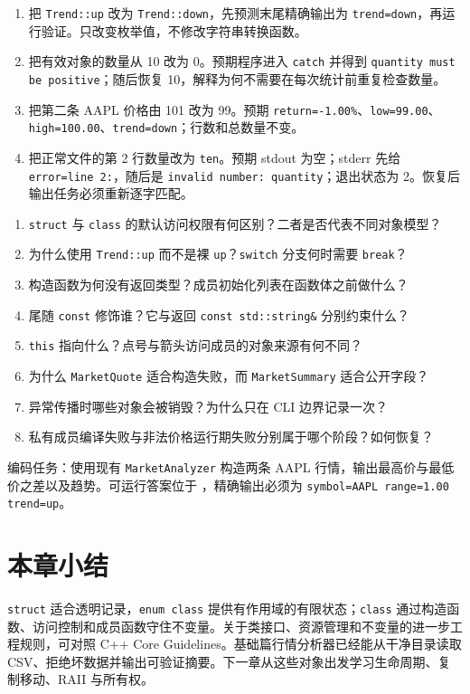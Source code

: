 \begin{enumerate}
  \item 把 \texttt{Trend::up} 改为 \texttt{Trend::down}，先预测末尾精确输出为 \texttt{trend=down}，再运行验证。只改变枚举值，不修改字符串转换函数。
  \item 把有效对象的数量从 10 改为 0。预期程序进入 \texttt{catch} 并得到 \texttt{quantity must be positive}；随后恢复 10，解释为何不需要在每次统计前重复检查数量。
  \item 把第二条 AAPL 价格由 101 改为 99。预期 \texttt{return=-1.00\%}、\texttt{low=99.00}、\texttt{high=100.00}、\texttt{trend=down}；行数和总数量不变。
  \item 把正常文件的第 2 行数量改为 \texttt{ten}。预期 stdout 为空；stderr 先给 \texttt{error=line 2:}，随后是 \texttt{invalid number: quantity}；退出状态为 2。恢复后输出任务必须重新逐字匹配。
\end{enumerate}

\begin{enumerate}
  \item \texttt{struct} 与 \texttt{class} 的默认访问权限有何区别？二者是否代表不同对象模型？
  \item 为什么使用 \texttt{Trend::up} 而不是裸 \texttt{up}？\texttt{switch} 分支何时需要 \texttt{break}？
  \item 构造函数为何没有返回类型？成员初始化列表在函数体之前做什么？
  \item 尾随 \texttt{const} 修饰谁？它与返回 \texttt{const std::string\&} 分别约束什么？
  \item \texttt{this} 指向什么？点号与箭头访问成员的对象来源有何不同？
  \item 为什么 \texttt{MarketQuote} 适合构造失败，而 \texttt{MarketSummary} 适合公开字段？
  \item 异常传播时哪些对象会被销毁？为什么只在 CLI 边界记录一次？
  \item 私有成员编译失败与非法价格运行期失败分别属于哪个阶段？如何恢复？
\end{enumerate}

编码任务：使用现有 \texttt{MarketAnalyzer} 构造两条 AAPL 行情，输出最高价与最低价之差以及趋势。可运行答案位于 ，精确输出必须为 \texttt{symbol=AAPL range=1.00 trend=up}。


\section{本章小结}

\texttt{struct} 适合透明记录，\texttt{enum class} 提供有作用域的有限状态；\texttt{class} 通过构造函数、访问控制和成员函数守住不变量。关于类接口、资源管理和不变量的进一步工程规则，可对照 C++ Core Guidelines\autocite{coreguidelines}。基础篇行情分析器已经能从干净目录读取 CSV、拒绝坏数据并输出可验证摘要。下一章从这些对象出发学习生命周期、复制移动、RAII 与所有权。
